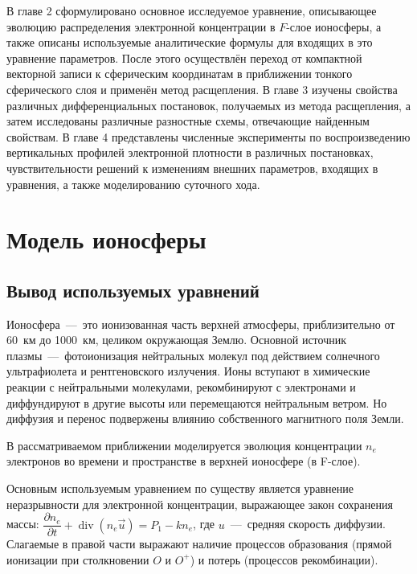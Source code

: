 \documentclass[14pt, a4paper, fleqn]{extarticle}
\renewcommand{\div}{\operatorname{div}}
\begin{document}
В главе 2 сформулировано основное исследуемое уравнение, описывающее эволюцию распределения электронной концентрации в $F$-слое ионосферы, а также описаны используемые аналитические формулы для входящих в это уравнение параметров. После этого осуществлён переход от компактной векторной записи к сферическим координатам в приближении тонкого сферического слоя и применён метод расщепления. В главе 3 изучены свойства различных дифференциальных постановок, получаемых из метода расщепления, а затем исследованы различные разностные схемы, отвечающие найденным свойствам. В главе 4 представлены численные эксперименты по воспроизведению вертикальных профилей электронной плотности в различных постановках, чувствительности решений к изменениям внешних параметров, входящих в уравнения, а также  моделированию суточного хода.

\section{Модель ионосферы}

\subsection{Вывод используемых уравнений}

Ионосфера~---~это ионизованная часть верхней атмосферы, приблизительно от 60~км до 1000~км, целиком окружающая Землю. Основной источник плазмы~---~фотоионизация нейтральных молекул под действием солнечного ультрафиолета и рентгеновского излучения. Ионы вступают в химические реакции с нейтральными молекулами, рекомбинируют с электронами и диффундируют в другие высоты или перемещаются нейтральным ветром. Но диффузия и перенос подвержены влиянию собственного магнитного поля Земли.

\medskip

В рассматриваемом приближении моделируется эволюция концентрации $n_e$ электронов во времени и пространстве в верхней ионосфере (в F-слое).

\medskip

Основным используемым уравнением по существу является уравнение неразрывности для электронной концентрации, выражающее закон сохранения массы: $\dfrac{\partial n_e}{\partial t}+\div(n_e \vec{u})=P_1-kn_e$, где $u$~---~средняя скорость диффузии. Слагаемые в правой части выражают наличие процессов образования (прямой ионизации при столкновении $O$ и $O^+$) и потерь (процессов рекомбинации).
\end{document}
